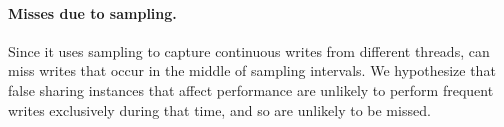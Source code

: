 \paragraph{Misses due to sampling.}  Since it uses sampling to capture continuous writes from different threads, \SheriffDetect{} can miss writes that occur in the middle of sampling intervals. We hypothesize that false sharing instances that affect performance are unlikely to perform frequent writes exclusively during that time, and so are unlikely to be missed.

